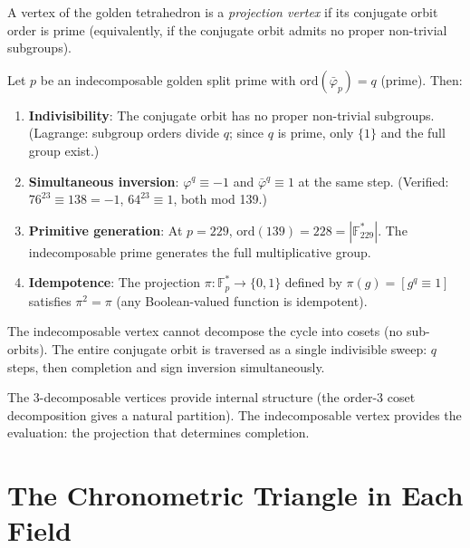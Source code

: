 \begin{definition}
A vertex of the golden tetrahedron is a \emph{projection vertex}
if its conjugate orbit order is prime (equivalently, if the
conjugate orbit admits no proper non-trivial subgroups).
\end{definition}

\begin{theorem}
\label{thm:projection}
Let $p$ be an indecomposable golden split prime with
$\mathrm{ord}(\bar\varphi_p) = q$ (prime). Then:
\begin{enumerate}
  \item \textbf{Indivisibility}: The conjugate orbit has no proper
    non-trivial subgroups. (Lagrange: subgroup orders divide $q$;
    since $q$ is prime, only $\{1\}$ and the full group exist.)
  \item \textbf{Simultaneous inversion}: $\varphi^q \equiv -1$ and
    $\bar\varphi^q \equiv 1$ at the same step.
    (Verified: $76^{23} \equiv 138 = -1$, $64^{23} \equiv 1$, both mod 139.)
  \item \textbf{Primitive generation}: At $p = 229$,
    $\mathrm{ord}(139) = 228 = |\mathbb{F}_{229}^*|$.
    The indecomposable prime generates the full multiplicative group.
  \item \textbf{Idempotence}: The projection
    $\pi: \mathbb{F}_p^* \to \{0, 1\}$ defined by
    $\pi(g) = [g^q \equiv 1]$ satisfies $\pi^2 = \pi$
    (any Boolean-valued function is idempotent).
\end{enumerate}
\end{theorem}

The indecomposable vertex cannot decompose the cycle into cosets
(no sub-orbits). The entire conjugate orbit is traversed as a single
indivisible sweep: $q$ steps, then completion and sign inversion
simultaneously.

The 3-decomposable vertices provide internal structure (the
order-3 coset decomposition gives a natural partition). The
indecomposable vertex provides the evaluation: the projection
that determines completion.

\section{The Chronometric Triangle in Each Field}
\label{sec:chrono}

